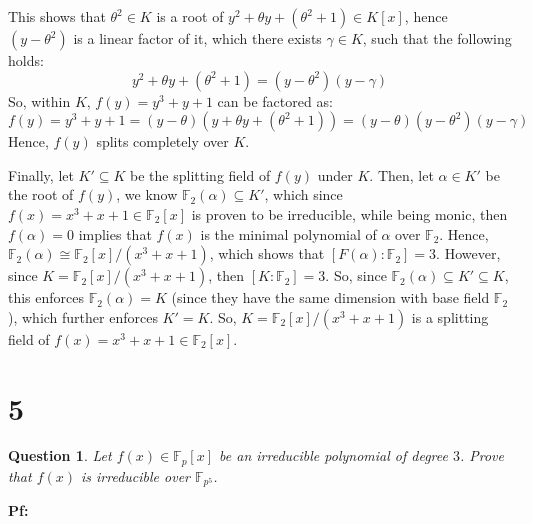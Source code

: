 \documentclass{article}
\newtheorem{question}{Question}
\begin{document}
This shows that $\theta^2\in K$ is a root of $y^2+\theta y+(\theta^2+1)\in K[x]$, hence $(y-\theta^2)$ is a linear factor of it, which there exists $\gamma\in K$, such that the following holds:
$$y^2+\theta y + (\theta^2+1) = (y-\theta^2)(y-\gamma)$$
So, within $K$, $f(y)=y^3+y+1$ can be factored as:
$$f(y)=y^3+y+1 = (y-\theta)(y+\theta y+(\theta^2+1)) = (y-\theta)(y-\theta^2)(y-\gamma)$$
Hence, $f(y)$ splits completely over $K$.

\hfil

Finally, let $K'\subseteq K$ be the splitting field of $f(y)$ under $K$. Then, let $\alpha\in K'$ be the root of $f(y)$, we know $\mathbb{F}_2(\alpha)\subseteq K'$, which since $f(x)=x^3+x+1\in \mathbb{F}_2[x]$ is proven to be irreducible, while being monic, then $f(\alpha) = 0$ implies that $f(x)$ is the minimal polynomial of $\alpha$ over $\mathbb{F}_2$. Hence, $\mathbb{F}_2(\alpha)\cong \mathbb{F}_2[x]/(x^3+x+1)$, which shows that $[F(\alpha):\mathbb{F}_2]=3$. However, since $K=\mathbb{F}_2[x]/(x^3+x+1)$, then $[K:\mathbb{F}_2]=3$. So, since $\mathbb{F}_2(\alpha)\subseteq K'\subseteq K$, this enforces $\mathbb{F}_2(\alpha) = K$ (since they have the same dimension with base field $\mathbb{F}_2$), which further enforces $K'=K$. So, $K=\mathbb{F}_2[x]/(x^3+x+1)$ is a splitting field of $f(x)=x^3+x+1\in\mathbb{F}_2[x]$.

\break

\section*{5}
\begin{myBox}[]{}
    \begin{question}
        Let $f(x)\in\mathbb{F}_p[x]$ be an irreducible polynomial of degree $3$. Prove that $f(x)$ is irreducible over $\mathbb{F}_{p^5}$.
    \end{question}
\end{myBox}

\textbf{Pf:}
\end{document}
